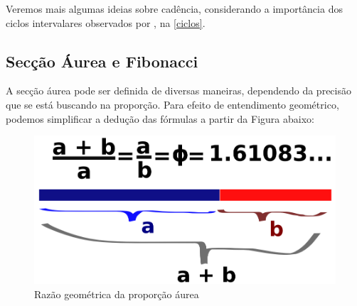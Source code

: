 \documentclass[
	12pt,				%
	openright,			%
	twoside,			%
	a4paper,			%
	english,			%
	french,				%
	spanish,			%
	brazil				%
	]{abntex2}
\begin{document}
Veremos mais algumas ideias sobre cadência, considerando a importância dos ciclos intervalares observados por , na \autoref{ciclos}.






\subsection{Secção Áurea e Fibonacci}
\label{fibo}

A secção áurea pode ser definida de diversas maneiras, dependendo da precisão que se está buscando na proporção. Para efeito de entendimento geométrico, podemos simplificar a dedução das fórmulas a partir da Figura abaixo: 

\begin{figure}[!h]
	\caption{\label{fig_grafico}Razão geométrica da proporção áurea }
	\begin{center}
	    \includegraphics[scale=0.25]{axis/proportionaurea.png}
	\end{center}
\end{figure}	
\end{document}
